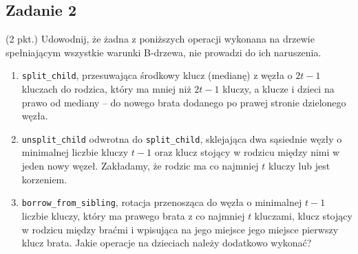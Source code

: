 \documentclass{article}
\begin{document}
\subsection*{Zadanie 2}
(2 pkt.) Udowodnij, że żadna z poniższych operacji wykonana na drzewie spełniającym wszystkie warunki B-drzewa, nie
prowadzi do ich naruszenia.
\begin{enumerate}[label=(\alph*)]
    \item \verb|split_child|, przesuwająca środkowy klucz (medianę) z węzła o $2t-1$ kluczach do rodzica, który ma
          mniej niż $2t-1$ kluczy, a klucze i dzieci na prawo od mediany -- do nowego brata dodanego po prawej stronie
          dzielonego węzła.
    \item \verb|unsplit_child| odwrotna do \verb|split_child|, sklejająca dwa sąsiednie węzły o minimalnej liczbie
          kluczy $t-1$ oraz klucz stojący w rodzicu między nimi w jeden nowy węzeł. Zakładamy, że rodzic ma co
          najmniej $t$ kluczy lub jest korzeniem.
    \item \verb|borrow_from_sibling|, rotacja przenosząca do węzła o minimalnej $t-1$ liczbie kluczy, który ma
          prawego brata z co najmniej $t$ kluczami, klucz stojący w rodzicu między braćmi i wpisująca na jego miejsce
          jego miejsce pierwszy klucz brata. Jakie operacje na dzieciach należy dodatkowo wykonać?
\end{enumerate}
\end{document}
